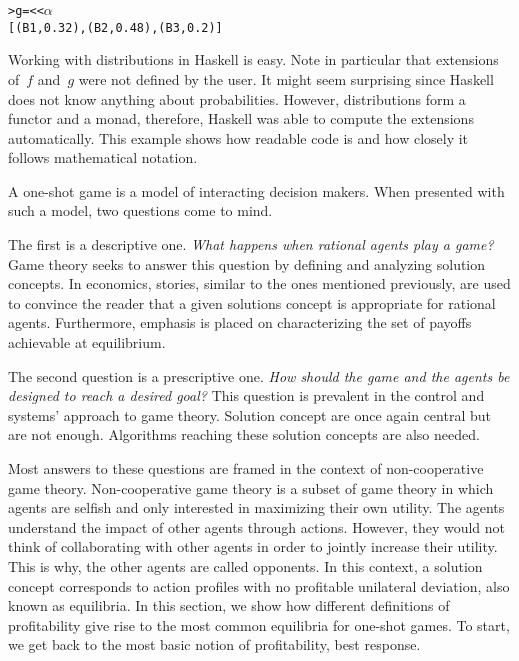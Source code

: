 \begin{example}
\begin{alltt}
> g =<< \(\alpha\)
[(B1, 0.32), (B2, 0.48), (B3, 0.2)]
\end{alltt}

Working with distributions in Haskell is easy.
Note in particular that extensions of~\(f\) and~\(g\) were not defined by the user.
It might seem surprising since Haskell does not know anything about probabilities.
However, distributions form a functor and a monad, therefore, Haskell was able to compute the extensions automatically.
This example shows how readable code is and how closely it follows mathematical notation.
\end{example}

A one-shot game is a model of interacting decision makers.
When presented with such a model, two questions come to mind.

The first is a descriptive one.
\emph{What happens when rational agents play a game?}
Game theory seeks to answer this question by defining and analyzing solution concepts.
In economics, stories, similar to the ones mentioned previously, are used to convince the reader that a given solutions concept is appropriate for rational agents.
Furthermore, emphasis is placed on characterizing the set of payoffs achievable at equilibrium.

The second question is a prescriptive one.
\emph{How should the game and the agents be designed to reach a desired goal?}
This question is prevalent in the control and systems' approach to game theory.
Solution concept are once again central but are not enough.
Algorithms reaching these solution concepts are also needed.

Most answers to these questions are framed in the context of non-cooperative game theory.
Non-cooperative game theory is a subset of game theory in which agents are selfish and only interested in maximizing their own utility.
The agents understand the impact of other agents through actions.
However, they would not think of collaborating with other agents in order to jointly increase their utility.
This is why, the other agents are called opponents.
In this context, a solution concept corresponds to action profiles with no profitable unilateral deviation, also known as equilibria.
In this section, we show how different definitions of profitability give rise to the most common equilibria for one-shot games.
To start, we get back to the most basic notion of profitability, best response.

